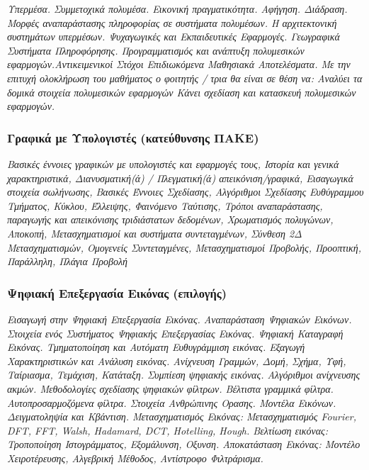 \emph{Υπερμέσα. Συμμετοχικά πολυμέσα. Εικονική πραγματικότητα. Αφήγηση.
Διάδραση. Μορφές αναπαράστασης πληροφορίας σε συστήματα πολυμέσων. Η
αρχιτεκτονική συστημάτων υπερμέσων. Ψυχαγωγικές και Εκπαιδευτικές
Εφαρμογές. Γεωγραφικά Συστήματα Πληροφόρησης. Προγραμματισμός και
ανάπτυξη πολυμεσικών εφαρμογών.Αντικειμενικοί Στόχοι Επιδιωκόμενα
Μαθησιακά Αποτελέσματα. Με την επιτυχή ολοκλήρωση του μαθήματος ο
φοιτητής / τρια θα είναι σε θέση να: Αναλύει τα δομικά στοιχεία
πολυμεσικών εφαρμογών Κάνει σχεδίαση και κατασκευή πολυμεσικών
εφαρμογών.}

\hypertarget{ux3b3ux3c1ux3b1ux3c6ux3b9ux3baux3ac-ux3bcux3b5-ux3c5ux3c0ux3bfux3bbux3bfux3b3ux3b9ux3c3ux3c4ux3adux3c2-ux3baux3b1ux3c4ux3b5ux3cdux3b8ux3c5ux3bdux3c3ux3b7ux3c2-ux3c0ux3b1ux3baux3b5}{%
\subsubsection{Γραφικά με Υπολογιστές (κατεύθυνσης
ΠΑΚΕ)}\label{ux3b3ux3c1ux3b1ux3c6ux3b9ux3baux3ac-ux3bcux3b5-ux3c5ux3c0ux3bfux3bbux3bfux3b3ux3b9ux3c3ux3c4ux3adux3c2-ux3baux3b1ux3c4ux3b5ux3cdux3b8ux3c5ux3bdux3c3ux3b7ux3c2-ux3c0ux3b1ux3baux3b5}}

\emph{Βασικές έννοιες γραφικών με υπολογιστές και εφαρμογές τους,
Ιστορία και γενικά χαρακτηριστικά, Διανυσματική(ά) / Πλεγματική(ά)
απεικόνιση/γραφικά, Εισαγωγικά στοιχεία σωλήνωσης, Βασικές Έννοιες
Σχεδίασης, Αλγόριθμοι Σχεδίασης Ευθύγραμμου Τμήματος, Κύκλου, Έλλειψης,
Φαινόμενο Ταύτισης, Τρόποι αναπαράστασης, παραγωγής και απεικόνισης
τριδιάστατων δεδομένων, Χρωματισμός πολυγώνων, Αποκοπή, Μετασχηματισμοί
και συστήματα συντεταγμένων, Σύνθεση 2Δ Μετασχηματισμών, Ομογενείς
Συντεταγμένες, Μετασχηματισμοί Προβολής, Προοπτική, Παράλληλη, Πλάγια
Προβολή}

\hypertarget{ux3c8ux3b7ux3c6ux3b9ux3b1ux3baux3ae-ux3b5ux3c0ux3b5ux3beux3b5ux3c1ux3b3ux3b1ux3c3ux3afux3b1-ux3b5ux3b9ux3baux3ccux3bdux3b1ux3c2-ux3b5ux3c0ux3b9ux3bbux3bfux3b3ux3aeux3c2}{%
\subsubsection{Ψηφιακή Επεξεργασία Εικόνας
(επιλογής)}\label{ux3c8ux3b7ux3c6ux3b9ux3b1ux3baux3ae-ux3b5ux3c0ux3b5ux3beux3b5ux3c1ux3b3ux3b1ux3c3ux3afux3b1-ux3b5ux3b9ux3baux3ccux3bdux3b1ux3c2-ux3b5ux3c0ux3b9ux3bbux3bfux3b3ux3aeux3c2}}

\emph{Εισαγωγή στην Ψηφιακή Επεξεργασία Εικόνας. Αναπαράσταση Ψηφιακών
Εικόνων. Στοιχεία ενός Συστήματος Ψηφιακής Επεξεργασίας Εικόνας. Ψηφιακή
Καταγραφή Εικόνας. Τμηματοποίηση και Αυτόματη Ευθυγράμμιση εικόνας.
Εξαγωγή Χαρακτηριστικών και Ανάλυση εικόνας. Ανίχνευση Γραμμών, Δομή,
Σχήμα, Υφή, Ταίριασμα, Τεμάχιση, Κατάταξη. Συμπίεση ψηφιακής εικόνας.
Αλγόριθμοι ανίχνευσης ακμών. Μεθοδολογίες σχεδίασης ψηφιακών φίλτρων.
Bέλτιστα γραμμικά φίλτρα. Αυτοπροσαρμοζόμενα φίλτρα. Στοιχεία Ανθρώπινης
Ορασης. Μοντέλα Εικόνων. Δειγματοληψία και Κβάντιση. Μετασχηματισμός
Εικόνας: Μετασχηματισμός Fourier, DFT, FFT, Walsh, Hadamard, DCT,
Hotelling, Hough. Βελτίωση εικόνας: Τροποποίηση Ιστογράμματος,
Εξομάλυνση, Οξυνση. Αποκατάσταση Εικόνας: Μοντέλο Χειροτέρευσης,
Αλγεβρική Μέθοδος, Αντίστροφο Φιλτράρισμα.}


